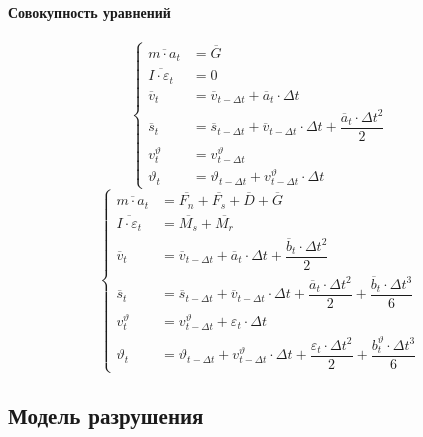 \documentclass[c]{beamer}  %
\begin{document}
\begin{frame}
\frametitle{\insertsection} 
\framesubtitle{Совокупность уравнений}
 {
\[
\left\lbrace
\begin{aligned}
\overline{m \cdot a_t} &= \overline{G}\\
\overline{I \cdot \varepsilon_t} &= 0\\
\overline{v}_{t} &= \overline{v}_{t - \Delta t} + \overline{a}_t \cdot \Delta t \\
\overline{s}_{t} &= \overline{s}_{t - \Delta t} + \overline{v}_{t - \Delta t} \cdot \Delta t + \dfrac{\overline{a}_t \cdot \Delta t^2}{2} \\
v_{t}^{\vartheta} &= v^{\vartheta}_{t - \Delta t}  \\
\vartheta_{t} &= \vartheta_{t - \Delta t} + v^{\vartheta}_{t - \Delta t} \cdot \Delta t
\end{aligned}
\right.
\]
} 
{
\[
\left\lbrace
\begin{aligned}
\overline{m \cdot a_t} &= \overline{F_n} + \overline{F_s} + \overline{D} + \overline{G}\\
\overline{I \cdot \varepsilon_t} &= \overline{M_s} + \overline{M_r}\\
\overline{v}_{t} &= \overline{v}_{t - \Delta t} + \overline{a}_t \cdot \Delta t + \dfrac{\overline{b}_t \cdot \Delta t^2}{2} \\
\overline{s}_{t} &= \overline{s}_{t - \Delta t} + \overline{v}_{t - \Delta t} \cdot \Delta t + \dfrac{\overline{a}_t \cdot \Delta t^2}{2} +  \dfrac{\overline{b}_t \cdot \Delta t^3}{6}\\
v_{t}^{\vartheta} &= v^{\vartheta}_{t - \Delta t} + \varepsilon_t \cdot \Delta t\\
\vartheta_{t} &= \vartheta_{t - \Delta t} + v^{\vartheta}_{t - \Delta t} \cdot \Delta t + \dfrac{\varepsilon_t \cdot \Delta t^2}{2} + \dfrac{b^{\vartheta}_t \cdot \Delta t^3}{6} 
\end{aligned}
\right.
\]
}


\end{frame}



\subsection{Модель разрушения}
\end{document}
